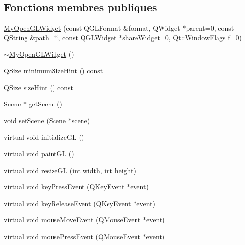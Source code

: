 \subsection*{Fonctions membres publiques}
\begin{DoxyCompactItemize}
\item 
\hyperlink{class_my_open_g_l_widget_a78f2284f348e8b482875ccdfbf704b34}{My\+Open\+G\+L\+Widget} (const Q\+G\+L\+Format \&format, Q\+Widget $\ast$parent=0, const Q\+String \&path=\char`\"{}\char`\"{}, const Q\+G\+L\+Widget $\ast$share\+Widget=0, Qt\+::\+Window\+Flags f=0)
\item 
\hyperlink{class_my_open_g_l_widget_aa9bdb4eb867d9e0bbfab210732fa5883}{$\sim$\+My\+Open\+G\+L\+Widget} ()
\item 
Q\+Size \hyperlink{class_my_open_g_l_widget_a4a037578f8e21a015e7b2915992fbe5d}{minimum\+Size\+Hint} () const 
\item 
Q\+Size \hyperlink{class_my_open_g_l_widget_abacca5d710f6a81b5edfd164f0148ed6}{size\+Hint} () const 
\item 
\hyperlink{class_scene}{Scene} $\ast$ \hyperlink{class_my_open_g_l_widget_ab25f238721b8e1cba36c2a0350ac57ba}{get\+Scene} ()
\item 
void \hyperlink{class_my_open_g_l_widget_aaac5737e9ce05a94006aa92afed5d403}{set\+Scene} (\hyperlink{class_scene}{Scene} $\ast$scene)
\item 
virtual void \hyperlink{class_my_open_g_l_widget_a98597f5669cec1c90f36c1d38569afc5}{initialize\+G\+L} ()
\item 
virtual void \hyperlink{class_my_open_g_l_widget_af7babfe769e968c317e646c4387b357d}{paint\+G\+L} ()
\item 
virtual void \hyperlink{class_my_open_g_l_widget_a51847d078dbd11fb99335abbc5eaf4fc}{resize\+G\+L} (int width, int height)
\item 
virtual void \hyperlink{class_my_open_g_l_widget_a87a479700547c066721b4b3532b040a2}{key\+Press\+Event} (Q\+Key\+Event $\ast$event)
\item 
virtual void \hyperlink{class_my_open_g_l_widget_a57e054ac1c21ed8585ca57b151ec6b38}{key\+Release\+Event} (Q\+Key\+Event $\ast$event)
\item 
virtual void \hyperlink{class_my_open_g_l_widget_a27abe02c04240317cf42c1cec1ac7e25}{mouse\+Move\+Event} (Q\+Mouse\+Event $\ast$event)
\item 
virtual void \hyperlink{class_my_open_g_l_widget_a6a2e229f91bb75775bb539c85bb696ef}{mouse\+Press\+Event} (Q\+Mouse\+Event $\ast$event)
\item 

\end{DoxyCompactItemize}
